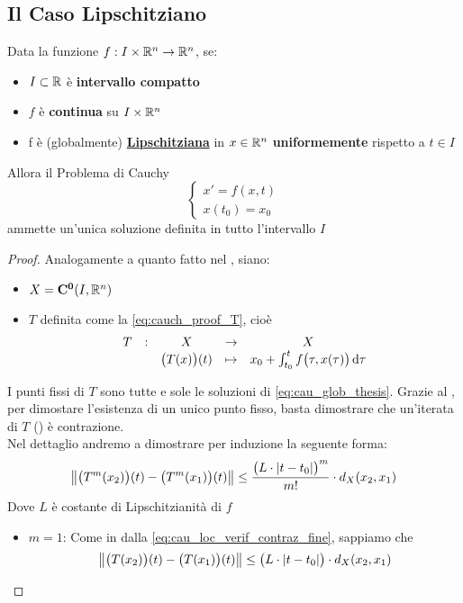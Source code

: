 \subsection{Il Caso Lipschitziano}
\begin{theorem}
	\label{teo:cau_glob_lips}
	Data la funzione $f:I \times \mathbb{R}^n \to \mathbb{R}^n$, se:
	\begin{itemize}[noitemsep]
		\item $I \subset \mathbb{R}$ è \textbf{intervallo compatto}
		\item $f$ è \textbf{continua} su $I \times \mathbb{R}^n$
		\item f è (globalmente) \hyperref[def:lips]{\textbf{Lipschitziana}} in $x \in \mathbb{R}^n$ \textbf{uniformemente} rispetto a $t \in I$
	\end{itemize}
	Allora il Problema di Cauchy
	\begin{equation}
		\label{eq:cau_glob_thesis}
		\begin{cases}
			x' = f(x,t)\\
			x(t_0) = x_0
		\end{cases}
	\end{equation}
	ammette un'unica soluzione definita in tutto l'intervallo $I$
	\begin{proof}
		Analogamente a quanto fatto nel , siano:
		\begin{itemize}[noitemsep]
			\item $X = \mathbf{C^{0}}(I,\mathbb{R}^n)$
			\item $T$ definita come la \cref{eq:cauch_proof_T}, cioè
			\[\begin{array}{ccccc} {T} & : & {X} & \to & {X} \\ & & { \bigl(T(x)\bigr)(t) } & \mapsto & { x_0+\int_{t_0}^tf\bigl(\tau,x(\tau)\bigr)\,\mathrm{d}{\tau} } \\ \end{array}\]
		\end{itemize}
		I punti fissi di $T$ sono tutte e sole le soluzioni di \cref{eq:cau_glob_thesis}. Grazie al , per dimostare l'esistenza di un unico punto fisso, basta dimostrare che un'iterata di $T$ () è contrazione.\\
		Nel dettaglio andremo a dimostrare per induzione la seguente forma:
		\[\left\|\bigl(T^m(x_2)\bigr)(t) - \bigl(T^m(x_1)\bigr)(t)\right\| \leq \frac{\bigl(L \cdot \left|t-t_0\right|\bigr)^m}{m!} \cdot d_X(x_2,x_1)\]
		Dove $L$ è costante di Lipschitzianità di $f$
		\begin{itemize}
			\item $m=1$: Come in dalla \cref{eq:cau_loc_verif_contraz_fine}, sappiamo che
			\begin{equation*}
				\norm{\bigl(T(x_2)\bigr)(t) - \bigl(T(x_1)\bigr)(t)} \leq \bigl(L \cdot \abs{t-t_0}\bigr) \cdot d_X(x_2,x_1)

\end{equation*}
\end{itemize}
\end{proof}
\end{theorem}
